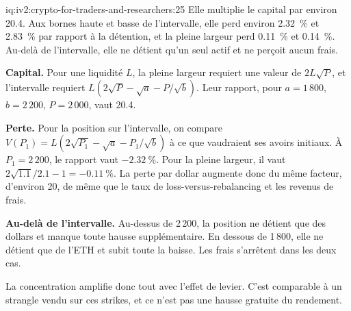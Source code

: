 \begin{solution}{iq:iv2:crypto-for-traders-and-researchers:25}
Elle multiplie le capital par environ 20.4. Aux bornes haute et basse de l'intervalle, elle perd environ 2.32~\% et 2.83~\% par rapport à la détention, et la pleine largeur perd 0.11~\% et 0.14~\%. Au-delà de l'intervalle, elle ne détient qu'un seul actif et ne perçoit aucun frais.

\textbf{Capital.} Pour une liquidité $L$, la pleine largeur requiert une valeur de $2L\sqrt{P}$, et l'intervalle requiert $L(2\sqrt{P} - \sqrt{a} - P/\sqrt{b})$. Leur rapport, pour $a = 1\,800$, $b = 2\,200$, $P = 2\,000$, vaut 20.4.

\textbf{Perte.} Pour la position sur l'intervalle, on compare $V(P_1) = L(2\sqrt{P_1} - \sqrt{a} - P_1/\sqrt{b})$ à ce que vaudraient ses avoirs initiaux. À $P_1 = 2\,200$, le rapport vaut $-2.32~\%$. Pour la pleine largeur, il vaut $2\sqrt{1.1}/2.1 - 1 = -0.11~\%$. La perte par dollar augmente donc du même facteur, d'environ 20, de même que le taux de loss-versus-rebalancing et les revenus de frais.

\textbf{Au-delà de l'intervalle.} Au-dessus de 2\,200, la position ne détient que des dollars et manque toute hausse supplémentaire. En dessous de 1\,800, elle ne détient que de l'ETH et subit toute la baisse. Les frais s'arrêtent dans les deux cas.

La concentration amplifie donc tout avec l'effet de levier. C'est comparable à un strangle vendu sur ces strikes, et ce n'est pas une hausse gratuite du rendement.

\end{solution}

